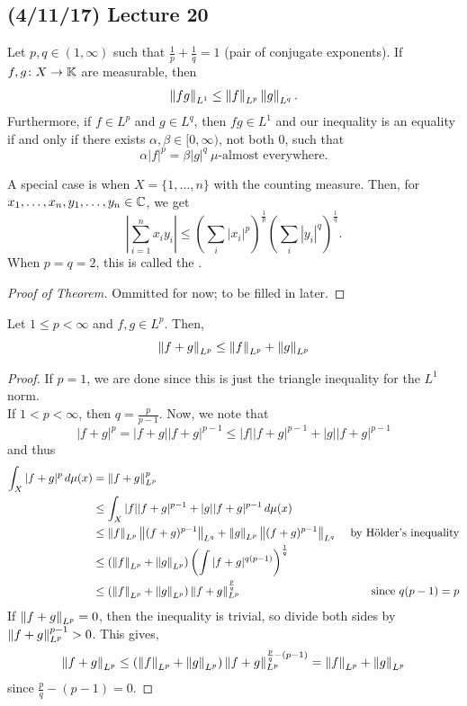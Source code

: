 \documentclass[11pt,leqno,oneside]{amsbook}
\numberwithin{thm}{section}
\newcommand{\K}{\mathbb{K}} %
\begin{document}
\subsection*{(4/11/17) Lecture 20}
\begin{thm}
  Let \(p,q \in (1,\infty)\) such that \(\frac{1}{p}+\frac{1}{q} = 1\)
  (pair of conjugate exponents). If \(f,g \from X \to \K\) are
  measurable, then \[
    \norm[fg]_{L^1} \leq \norm[f]_{L^p} \norm[g]_{L^q}.
  \]
  Furthermore, if \(f \in L^p\) and \(g \in L^q\), then \(fg \in L^1\)
  and our inequality is an equality if and only if there exists
  \(\alpha,\beta \in [0,\infty)\), not both 0, such that \[
    \alpha|f|^p = \beta |g|^q\ \mu\text{-almost everywhere.}
  \]
\end{thm}
\begin{rmk}
  A special case is when \(X = \{1,\ldots,n\}\) with the counting
  measure. Then, for \(x_1, \ldots, x_n, y_1, \ldots, y_n \in \C\), we
  get \[
    \left| \sum_{i=1}^n x_i y_i \right| \leq \left( \sum_i |x_i|^p
    \right)^\frac{1}{p} \left( \sum_i |y_i|^q\right)^\frac{1}{q}.
  \]
  When \(p=q=2\), this is called the .
\end{rmk}
\begin{proof}[Proof of Theorem]
  Ommitted for now; to be filled in later.
\end{proof}
\begin{thm}
  Let \(1 \leq p < \infty\) and \(f,g \in L^p\). Then, \[
    \norm[f+g]_{L^p} \leq \norm[f]_{L^p} + \norm[g]_{L^p}
  \]
\end{thm}
\begin{proof}
  If \(p=1\), we are done since this is just the triangle inequality
  for the \(L^1\) norm. \\

  If \(1 < p < \infty\), then \(q = \frac{p}{p-1}\). Now, we note
  that \[
    |f+g|^p = |f+g||f+g|^{p-1} \leq |f||f+g|^{p-1} + |g||f+g|^{p-1}
  \]
  and thus
  \begin{align*}
    \int_X |f+g|^p \d\mu(x) & = \norm[f+g]_{L^p}^p\\
    & \leq \int_X |f||f+g|^{p-1} + |g||f+g|^{p-1} \d\mu(x) \\
    & \leq \norm[f]_{L^p} \norm[(f+g)^{p-1}]_{L^q} +
      \norm[g]_{L^p}\norm[(f+g)^{p-1}]_{L^q} & \text{ by H\"{o}lder's
                                               inequality} \\
    & \leq \left( \norm[f]_{L^p} + \norm[g]_{L^p} \right) \left( \int
      |f+g|^{q(p-1)} \right)^\frac{1}{q} \\
    & \leq \left( \norm[f]_{L^p} + \norm[g]_{L^p} \right)
      \norm[f+g]_{L^p}^\frac{p}{q} & \text{ since }q(p-1) = p
  \end{align*}
  If \(\norm[f+g]_{L^p} = 0\), then the inequality is trivial, so divide
  both sides by \(\norm[f+g]_{L^p}^{p-1} > 0\). This gives, \[
    \norm[f+g]_{L^p} \leq (\norm[f]_{L^p} + \norm[g]_{L^p})
    \norm[f+g]_{L^p}^{\frac{p}{q}-(p-1)} = \norm[f]_{L^p} + \norm[g]_{L^p}
  \]
  since \(\frac{p}{q}-(p-1) = 0\).
\end{proof}
\end{document}
